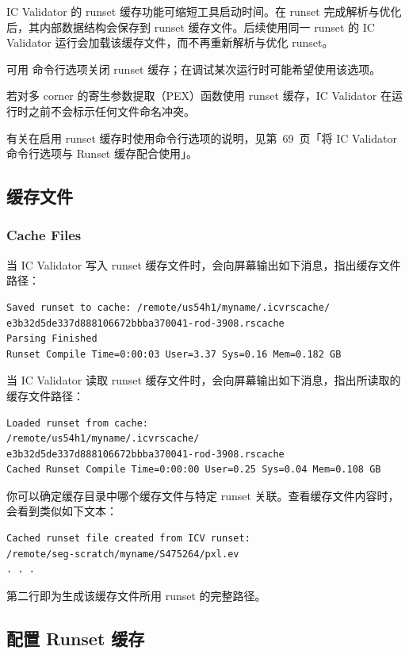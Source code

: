IC Validator 的 runset 缓存功能可缩短工具启动时间。在 runset 完成解析与优化后，其内部数据结构会保存到 runset 缓存文件。后续使用同一 runset 的 IC Validator 运行会加载该缓存文件，而不再重新解析与优化 runset。

可用  命令行选项关闭 runset 缓存；在调试某次运行时可能希望使用该选项。

\begin{noteBox}
若对多 corner 的寄生参数提取（PEX）函数使用 runset 缓存，IC Validator 在运行时之前不会标示任何文件命名冲突。
\end{noteBox}

\begin{seeAlsoBox}
有关在启用 runset 缓存时使用命令行选项的说明，见第~69~页「将 IC Validator 命令行选项与 Runset 缓存配合使用」。
\end{seeAlsoBox}

\subsection{缓存文件}
\subsubsection*{Cache Files}

当 IC Validator 写入 runset 缓存文件时，会向屏幕输出如下消息，指出缓存文件路径：
\begin{lstlisting}
Saved runset to cache: /remote/us54h1/myname/.icvrscache/
e3b32d5de337d888106672bbba370041-rod-3908.rscache
Parsing Finished
Runset Compile Time=0:00:03 User=3.37 Sys=0.16 Mem=0.182 GB
\end{lstlisting}

当 IC Validator 读取 runset 缓存文件时，会向屏幕输出如下消息，指出所读取的缓存文件路径：
\begin{lstlisting}
Loaded runset from cache:
/remote/us54h1/myname/.icvrscache/
e3b32d5de337d888106672bbba370041-rod-3908.rscache
Cached Runset Compile Time=0:00:00 User=0.25 Sys=0.04 Mem=0.108 GB
\end{lstlisting}

你可以确定缓存目录中哪个缓存文件与特定 runset 关联。查看缓存文件内容时，会看到类似如下文本：
\begin{lstlisting}
Cached runset file created from ICV runset:
/remote/seg-scratch/myname/S475264/pxl.ev
. . .
\end{lstlisting}

第二行即为生成该缓存文件所用 runset 的完整路径。

\subsection{配置 Runset 缓存}
